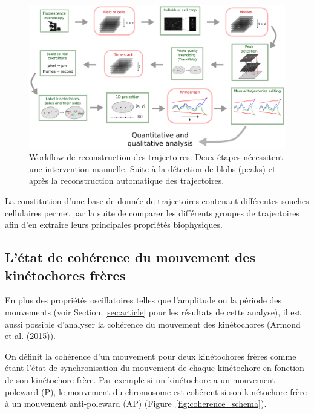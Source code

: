 \documentclass[12pt,a4paper,twoside,openright]{book}
\begin{document}
\begin{figure}[htbp]
\centering
\includegraphics{figures/results/imaging/workflow.png}
\caption[Workflow de reconstruction des trajectoires]{\label{fig:workflow}Workflow
de reconstruction des trajectoires. Deux étapes nécessitent une
intervention manuelle. Suite à la détection de blobs (peaks) et après la
reconstruction automatique des trajectoires.}
\end{figure}

La constitution d'une base de donnée de trajectoires contenant
différentes souches cellulaires permet par la suite de comparer les
différents groupes de trajectoires afin d'en extraire leurs principales
propriétés biophysiques.

\subsection{L'état de cohérence du mouvement des kinétochores
frères}\label{luxe9tat-de-cohuxe9rence-du-mouvement-des-kinuxe9tochores-fruxe8res}

En plus des propriétés oscillatoires telles que l'amplitude ou la
période des mouvements (voir Section~\ref{sec:article} pour les
résultats de cette analyse), il est aussi possible d'analyser la
cohérence du mouvement des kinétochores (Armond et al.
(\hyperref[ref-Armond2015]{2015})).

On définit la cohérence d'un mouvement pour deux kinétochores frères
comme étant l'état de synchronisation du mouvement de chaque kinétochore
en fonction de son kinétochore frère. Par exemple si un kinétochore a un
mouvement poleward (P), le mouvement du chromosome est cohérent si son
kinétochore frère à un mouvement anti-poleward (AP)
(Figure~\ref{fig:coherence_schema}).
\end{document}
